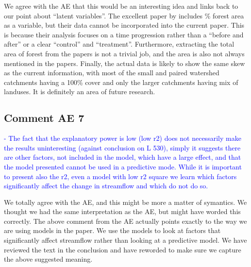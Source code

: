 \documentclass[]{elsarticle} %
\begin{document}
We agree with the AE that this would be an interesting idea and links back to our point about ``latent variables''. The excellent paper by \citet{levy2018} includes \% forest area as a variable, but their data cannot be incorporated into the current paper. This is because their analysis focuses on a time progression rather than a ``before and after'' or a clear ``control'' and ``treatment''.
Furthermore, extracting the total area of forest from the papers is not a trivial job, and the area is also not always mentioned in the papers. Finally, the actual data is likely to show the same skew as the current information, with most of the small and paired watershed catchments having a 100\% cover and only the larger catchments having mix of landuses. It is definitely an area of future research.

\hypertarget{comment-ae-7}{%
\subsection{Comment AE 7}\label{comment-ae-7}}

\textcolor{blue}{- The fact that the explanatory power is low (low r2) does not necessarily make the results uninteresting (against conclusion on L 530), simply it suggests there are other factors, not included in the model, which have a large effect, and that the model presented cannot be used in a predictive mode. While it is important to present also the r2, even a model with low r2 square we learn which factors significantly affect the change in streamflow and which do not do so.}

We totally agree with the AE, and this might be more a matter of symantics. We thought we had the same interpretation as the AE, but might have worded this correctly. The above comment from the AE actually points exactly to the way we are using models in the paper. We use the models to look at factors that significantly affect streamflow rather than looking at a predictive model.
We have reviewed the text in the conclusion and have reworded to make sure we capture the above suggested meaning.


\end{document}

